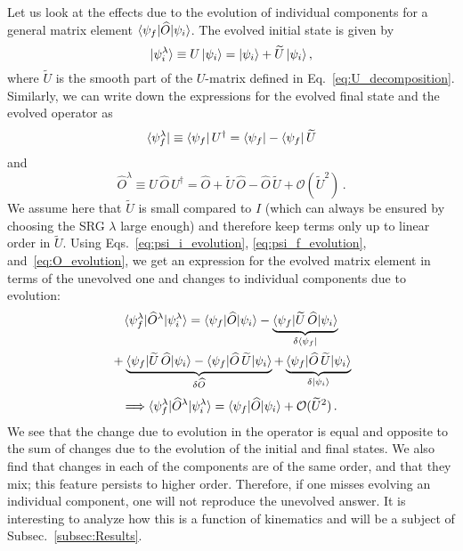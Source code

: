 	Let us look at the effects due to the evolution of individual components for a
	general matrix element $\langle \psi_f|\widehat{O}|\psi_i\rangle$.  The evolved
	initial state is given by
	\begin{equation}
	 {|\psi_i^\lambda\rangle} \equiv U \, {|\psi_i\rangle}
	 = {|\psi_i\rangle} + \widetilde{U} \, {|\psi_i\rangle} \,,
	\label{eq:psi_i_evolution}
	\end{equation}
	where $\widetilde{U}$ is the smooth part of the $U$-matrix defined in
	Eq.~\eqref{eq:U_decomposition}.  Similarly, we can write down the expressions
	for the evolved final state and the evolved operator as
	\begin{equation}
	 {\langle\psi_f^\lambda|} \equiv {\langle\psi_f|} \, U^\dag
	 = {\langle\psi_f|} - {\langle\psi_f|}\,\widetilde{U}
	\label{eq:psi_f_evolution}
	\end{equation}
	and
	\begin{equation}
	 \widehat{O}^\lambda
	 \equiv U \, \widehat{O} \, U^\dag = \widehat{O}
	 + \widetilde{U}\, \widehat{O} - \widehat{O} \, \widetilde{U}
	 + \mathcal{O}(\widetilde{U}^2) \,.
	\label{eq:O_evolution}
	\end{equation}
	We assume here that $\widetilde{U}$ is small compared to $I$ (which can always
	be ensured by choosing the SRG $\lambda$ large enough) and therefore keep
	terms	only up to linear order in $\widetilde{U}$.  Using
	Eqs.~\eqref{eq:psi_i_evolution}, \eqref{eq:psi_f_evolution},
	and~\eqref{eq:O_evolution}, we get an expression for the evolved matrix
	element	in terms of the unevolved one and changes to individual components
	due to evolution:
	\begin{multline}
	 \mbraket{\psi_f^\lambda}{\widehat{O}^\lambda}{\psi_i^\lambda}
	 = \mbraket{\psi_f}{\widehat{O}}{\psi_i} - \underbrace{\mbraket{\psi_f}
	  {\widetilde{U} \, \widehat{O}}{\psi_i}}_{\delta \bra{\psi_f}} \\
	 \null + \underbrace{\mbraket{\psi_f}{\widetilde{U} \, \widehat{O}}{\psi_i}
	 - \mbraket{\psi_f}{\widehat{O} \, \widetilde{U}}{\psi_i}}_{\delta\widehat{O}}
	 + \underbrace{
	  \mbraket{\psi_f} {\widehat{O} \, \widetilde{U}}{\psi_i}
	 }_{\delta\ket{\psi_i}}
	\end{multline}
	\begin{equation}
	\Longrightarrow \langle \psi_f^\lambda|\widehat{O}^\lambda|\psi_i^\lambda\rangle
	 = \langle \psi_f|\widehat{O}|\psi_i\rangle + \mathcal{O}(\widetilde{U}^2) \,.
	\end{equation}
	We see that the change due to evolution in the operator is equal and opposite
	to the sum of changes due to the evolution of the initial and final states.
	We also find that changes in each of the components are of the same order,
	and	that they mix;  this feature persists to higher order.  Therefore, if one
	misses evolving an individual component, one will not reproduce the unevolved
	answer.  It is interesting to analyze how this is a function of kinematics
	and will be a subject of Subsec.~\ref{subsec:Results}.



